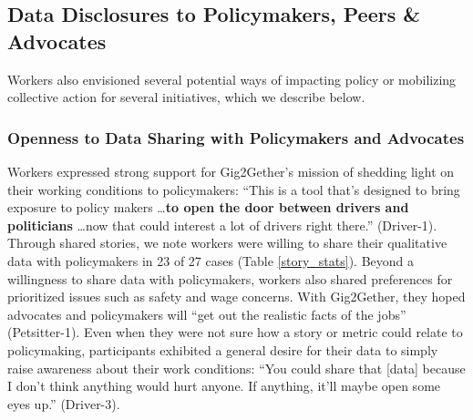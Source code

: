 \subsection{Data Disclosures to Policymakers, Peers \& Advocates}\label{Findings_Sharing}
{Workers also envisioned several potential ways of impacting policy or mobilizing collective action for several initiatives, which we describe below}.

\subsubsection{Openness to Data Sharing with Policymakers and Advocates}
Workers expressed strong support for Gig2Gether's mission of shedding light on their working conditions to policymakers: ``This is a tool that's designed to bring exposure to policy makers \dots \textbf{to open the door between drivers and politicians} \dots now that could interest a lot of drivers right there.'' (Driver-1). 
{Through shared stories, we note workers were willing to share their qualitative data with policymakers in 23 of 27 cases (Table \ref{story_stats}). }
Beyond a willingness to share data with policymakers, workers also shared preferences for prioritized issues such as safety and wage concerns. With Gig2Gether, they hoped advocates and policymakers will ``get out the realistic facts of the jobs'' (Petsitter-1). Even when they were not sure how a story or metric could relate to policymaking, participants exhibited a general desire for their data to simply raise awareness about their work conditions: ``You could share that [data] because I don't think anything would hurt anyone. If anything, it'll maybe open some eyes up.'' (Driver-3). 

